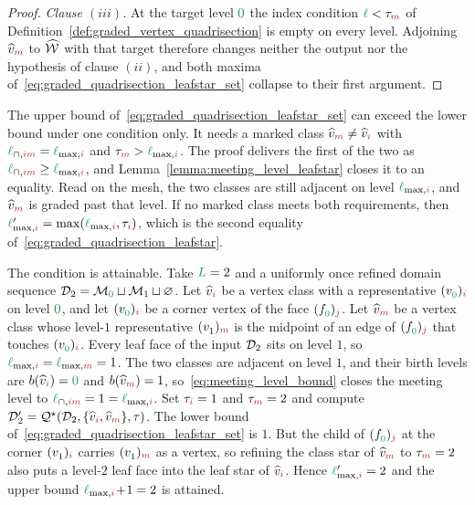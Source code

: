 \documentclass[a4paper, 12pt]{article}
\makeatletter
\newcommand{\quadriV}{\mathcal{Q}^{\star}}                       %
\newcommand{\quadriVup}[1]{\quadriV_{\rightarrow #1}}            %
\newcommand{\lmaxIdx}[1]{\l_{\max,#1}}
\newcommand{\lmeetIdx}[2]{\l_{\cap,#1#2}}
\newcommand{\targetlevel}{\tau}                                 %
\newcommand{\green}{\color{ForestGreen}}
\newcommand{\brickred}{\color{BrickRed}}
\newcommand{\vertex}[2]{\freeQ{v}{}{#1}{#2}}
\newcommand{\vertexClass}[1]{\widehat{v}_{#1}}
\DeclareRobustCommand{\markedVertexClasses}[1][]{\widehat{\mathcal{W}}\ifx\@empty#1\@empty\else^{#1}\fi}
\newcommand{\face}[2]{\freeQ{f}{}{#1}{#2}}
\newcommand{\coarseIdxone}{{\brickred i}}
\newcommand{\coarseIdxtwo}{{\brickred m}}
\newcommand{\fineIdxone}{{\brickred j}}
\renewcommand{\l}{{\green\ell}}
\renewcommand{\L}{{\green L}}
\newcommand{\lzero}{{\green 0}}
\newcommand{\freeQ}[4]{ ( {#1}^{#2}_{#3} )_{#4}}
\newcommand{\M}{\mathcal{M}}
\theoremstyle{definition}
\theoremstyle{plain}
\numberwithin{equation}{section}
\newcommand{\tobecut}[1]{{\color{red} #1}}     %
\DeclareRobustCommand{\domseq}[1][]{\mathcal{D}\ifx\@empty#1\@empty\else_{#1}\fi}
\newcommand{\birthLevel}{b}
\makeatother
\begin{document}
\begin{proof}
    \emph{Clause $(iii)$.} At the target level $\lzero$ the index condition $\l < \targetlevel_\coarseIdxtwo$ of Definition~\ref{def:graded_vertex_quadrisection} is empty on every level. Adjoining $\vertexClass{\coarseIdxtwo}$ to $\markedVertexClasses$ with that target therefore changes neither the output nor the hypothesis of clause $(ii)$, and both maxima of~\eqref{eq:graded_quadrisection_leafstar_set} collapse to their first argument.
\end{proof}

The upper bound of~\eqref{eq:graded_quadrisection_leafstar_set} can exceed the lower bound under one condition only. It needs a marked class $\vertexClass{\coarseIdxtwo} \neq \vertexClass{\coarseIdxone}$ with $\lmeetIdx{\coarseIdxone}{\coarseIdxtwo} = \lmaxIdx{\coarseIdxone}$ and $\targetlevel_\coarseIdxtwo > \lmaxIdx{\coarseIdxone}$. The proof delivers the first of the two as $\lmeetIdx{\coarseIdxone}{\coarseIdxtwo} \geq \lmaxIdx{\coarseIdxone}$, and Lemma~\ref{lemma:meeting_level_leafstar} closes it to an equality. Read on the mesh, the two classes are still adjacent on level $\lmaxIdx{\coarseIdxone}$, and $\vertexClass{\coarseIdxtwo}$ is graded past that level. If no marked class meets both requirements, then $\lmaxIdx{\coarseIdxone}' = \max(\lmaxIdx{\coarseIdxone}, \targetlevel_\coarseIdxone)$, which is the second equality of~\eqref{eq:graded_quadrisection_leafstar}.

The condition is attainable. Take $\L = 2$ and a uniformly once refined domain sequence $\domseq[2] = \M_\lzero \sqcup \M_1 \sqcup \varnothing$. Let $\vertexClass{\coarseIdxone}$ be a vertex class with a representative $\vertex{\lzero}{\coarseIdxone}$ on level $\lzero$, and let $\vertex{\lzero}{\coarseIdxone}$ be a corner vertex of the face $\face{\lzero}{\fineIdxone}$. Let $\vertexClass{\coarseIdxtwo}$ be a vertex class whose level-$1$ representative $\vertex{1}{\coarseIdxtwo}$ is the midpoint of an edge of $\face{\lzero}{\fineIdxone}$ that touches $\vertex{\lzero}{\coarseIdxone}$. Every leaf face of the input $\domseq[2]$ sits on level $1$, so $\lmaxIdx{\coarseIdxone} = \lmaxIdx{\coarseIdxtwo} = 1$. The two classes are adjacent on level $1$, and their birth levels are $\birthLevel(\vertexClass{\coarseIdxone}) = \lzero$ and $\birthLevel(\vertexClass{\coarseIdxtwo}) = 1$, so~\eqref{eq:meeting_level_bound} closes the meeting level to $\lmeetIdx{\coarseIdxone}{\coarseIdxtwo} = 1 = \lmaxIdx{\coarseIdxone}$. Set $\targetlevel_\coarseIdxone = 1$ and $\targetlevel_\coarseIdxtwo = 2$ and compute $\domseq[2]' = \quadriV(\domseq[2], \{ \vertexClass{\coarseIdxone}, \vertexClass{\coarseIdxtwo} \}, \targetlevel)$. The lower bound of~\eqref{eq:graded_quadrisection_leafstar_set} is $1$. But the child of $\face{\lzero}{\fineIdxone}$ at the corner $\vertex{1}{\coarseIdxone}$ carries $\vertex{1}{\coarseIdxtwo}$ as a vertex, so refining the class star of $\vertexClass{\coarseIdxtwo}$ to $\targetlevel_\coarseIdxtwo = 2$ also puts a level-$2$ leaf face into the leaf star of $\vertexClass{\coarseIdxone}$. Hence $\lmaxIdx{\coarseIdxone}' = 2$ and the upper bound $\lmaxIdx{\coarseIdxone} \! + \! 1 = 2$ is attained. 
\end{document}
